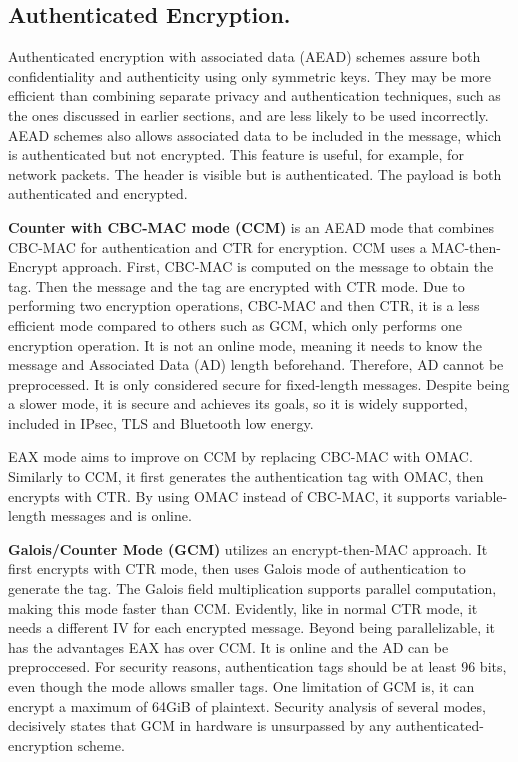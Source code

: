 \subsection{Authenticated Encryption.}  \label{crypto:aead}

Authenticated encryption with associated data (AEAD) schemes assure both confidentiality and authenticity using only symmetric keys. They may be more efficient than combining separate privacy and authentication techniques, such as the ones discussed in earlier sections, and are less likely to be used incorrectly. AEAD schemes also allows associated data to be included in the message, which is authenticated but not encrypted. This feature is useful, for example, for network packets. The header is visible but is authenticated. The payload is both authenticated and encrypted. 

\textbf{Counter with CBC-MAC mode (CCM)} is an AEAD mode that combines CBC-MAC for authentication and CTR for encryption.
CCM uses a MAC-then-Encrypt approach. First, CBC-MAC is computed on the message to obtain the tag. Then the message and the tag are encrypted with CTR mode.
Due to performing two encryption operations, CBC-MAC and then CTR, it is a less efficient mode compared to others such as GCM, which only performs one encryption operation.
It is not an online mode, meaning it needs to know the message and Associated Data (AD) length beforehand. Therefore, AD cannot be preprocessed. It is only considered secure for fixed-length messages.
Despite being a slower mode, it is secure and achieves its goals, so it is widely supported, included in IPsec, TLS and Bluetooth low energy.

EAX mode aims to improve on CCM by replacing CBC-MAC with OMAC. Similarly to CCM, it first generates the authentication tag with OMAC, then encrypts with CTR.
By using OMAC instead of CBC-MAC, it supports variable-length messages and is online.

\textbf{Galois/Counter Mode (GCM)} utilizes an encrypt-then-MAC approach. It first encrypts with CTR mode, then uses Galois mode of authentication to generate the tag. The Galois field multiplication supports parallel computation, making this mode faster than CCM.
Evidently, like in normal CTR mode, it needs a different IV for each encrypted message.
Beyond being parallelizable, it has the advantages EAX has over CCM. It is online and the AD can be preproccesed.
For security reasons, authentication tags should be at least 96 bits, even though the mode allows smaller tags. One limitation of GCM is, it can encrypt a maximum of 64GiB of plaintext. Security analysis of several modes, decisively states that GCM in hardware is unsurpassed by any authenticated-encryption scheme.


